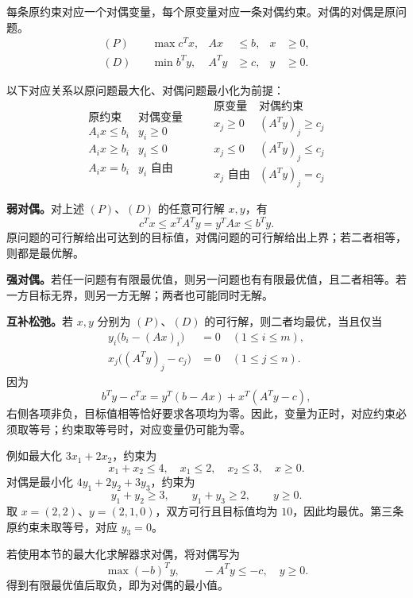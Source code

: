 每条原约束对应一个对偶变量，每个原变量对应一条对偶约束。对偶的对偶是原问题。
\[
\begin{aligned}
(P)\quad&\max c^Tx,& Ax&\le b,&x&\ge0,\\
(D)\quad&\min b^Ty,& A^Ty&\ge c,&y&\ge0.
\end{aligned}
\]

以下对应关系以原问题最大化、对偶问题最小化为前提：
\[
\begin{array}{c|c}
\text{原约束}&\text{对偶变量}\\\hline
A_i x\le b_i&y_i\ge0\\
A_i x\ge b_i&y_i\le0\\
A_i x=b_i&y_i\text{ 自由}
\end{array}
\qquad
\begin{array}{c|c}
\text{原变量}&\text{对偶约束}\\\hline
x_j\ge0&(A^Ty)_j\ge c_j\\
x_j\le0&(A^Ty)_j\le c_j\\
x_j\text{ 自由}&(A^Ty)_j=c_j
\end{array}
\]

\textbf{弱对偶。}对上述 $(P)$、$(D)$ 的任意可行解 $x,y$，有
\[
c^Tx\le x^TA^Ty=y^TAx\le b^Ty.
\]
原问题的可行解给出可达到的目标值，对偶问题的可行解给出上界；若二者相等，则都是最优解。

\textbf{强对偶。}若任一问题有有限最优值，则另一问题也有有限最优值，且二者相等。若一方目标无界，则另一方无解；两者也可能同时无解。

\textbf{互补松弛。}若 $x,y$ 分别为 $(P)$、$(D)$ 的可行解，则二者均最优，当且仅当
\[
\begin{aligned}
y_i\bigl(b_i-(Ax)_i\bigr)&=0\quad(1\le i\le m),\\
x_j\bigl((A^Ty)_j-c_j\bigr)&=0\quad(1\le j\le n).
\end{aligned}
\]
因为
\[
b^Ty-c^Tx=y^T(b-Ax)+x^T(A^Ty-c),
\]
右侧各项非负，目标值相等恰好要求各项均为零。因此，变量为正时，对应约束必须取等号；约束取等号时，对应变量仍可能为零。

例如最大化 $3x_1+2x_2$，约束为
\[
x_1+x_2\le4,\quad x_1\le2,\quad x_2\le3,\quad x\ge0.
\]
对偶是最小化 $4y_1+2y_2+3y_3$，约束为
\[
y_1+y_2\ge3,\qquad y_1+y_3\ge2,\qquad y\ge0.
\]
取 $x=(2,2)$、$y=(2,1,0)$，双方可行且目标值均为 $10$，因此均最优。第三条原约束未取等号，对应 $y_3=0$。

若使用本节的最大化求解器求对偶，将对偶写为
\[
\max(-b)^Ty,\qquad -A^Ty\le-c,\quad y\ge0.
\]
得到有限最优值后取负，即为对偶的最小值。
